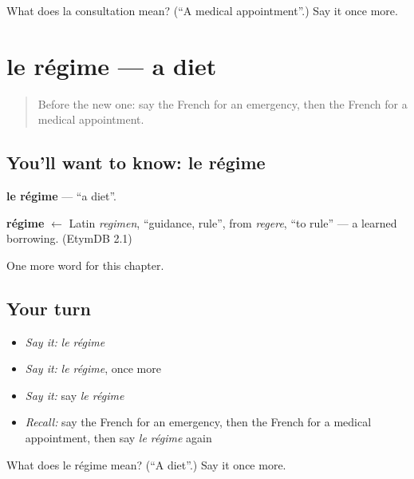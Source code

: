 \begin{tcolorbox}[breakable,colback=teal!4,colframe=teal!35!black,title={Before you move on}]
What does la consultation mean? (\textquotedblleft{}A medical appointment\textquotedblright{}.) Say it once more.
\end{tcolorbox}
\section[le régime]{le régime — a diet}

\label{lesson:FR-C243-regime}



\begin{quote}
Before the new one: say the French for an emergency, then the French for a medical appointment.
\end{quote}

\subsection*{You'll want to know: le régime}
\textbf{le régime} — \textquotedblleft{}a diet\textquotedblright{}.

\begin{cousinweb}
\textbf{régime} $\leftarrow$ Latin \emph{regimen}, \textquotedblleft{}guidance, rule\textquotedblright{}, from \emph{regere}, \textquotedblleft{}to rule\textquotedblright{} — a learned borrowing. (EtymDB 2.1)
\end{cousinweb}

\begin{grammarlens}[title={What you've built}]
One more word for this chapter.
\end{grammarlens}

\subsection*{Your turn}
\begin{itemize}
\raggedright
  \item \emph{Say it:} \emph{le régime}
  \item \emph{Say it:} \emph{le régime}, once more
  \item \emph{Say it:} say \emph{le régime}
  \item \emph{Recall:} say the French for an emergency, then the French for a medical appointment, then say \emph{le régime} again
\end{itemize}

\begin{tcolorbox}[breakable,colback=teal!4,colframe=teal!35!black,title={Before you move on}]
What does le régime mean? (\textquotedblleft{}A diet\textquotedblright{}.) Say it once more.
\end{tcolorbox}
